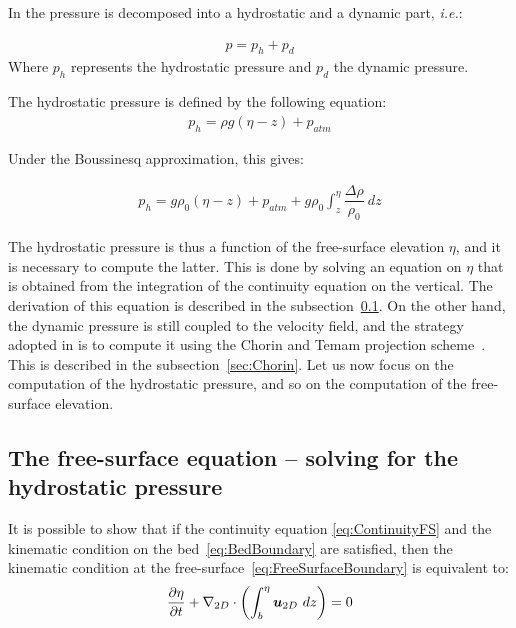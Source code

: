 In  the pressure is decomposed into a hydrostatic and a dynamic part, \textit{i.e.}:

\begin{align}
  p=p_h+p_d
\end{align}
Where $p_h$ represents the hydrostatic pressure and $p_d$ the dynamic pressure.


The hydrostatic pressure is defined by the following equation:
\begin{align}
  p_h = \rho g (\eta-z) + p_{atm}
\end{align}

Under the Boussinesq approximation, this gives:

\begin{align}
  p_h  = g\rho_0(\eta-z) + p_{atm} + g\rho_0\int_z^\eta\dfrac{\Delta\rho}{\rho_0}~dz
\end{align}

The hydrostatic pressure is thus a function of the free-surface elevation $\eta$, and it is necessary to compute the latter.
This is done by solving an equation on $\eta$ that is obtained from the integration of the continuity equation on the vertical.
The derivation of this equation is described in the subsection~\ref{sec:FSequation}.
On the other hand, the dynamic pressure is still coupled to the velocity field, and the strategy adopted in 
is to compute it using the Chorin and Temam projection scheme~\cite{Chorin1968, Temam1968}.
This is described in the subsection~\ref{sec:Chorin}.
Let us now focus on the computation of the hydrostatic pressure, and so on the computation of the free-surface elevation.


\subsection{The free-surface equation -- solving for the hydrostatic pressure}\label{sec:FSequation}

It is possible to show that if the continuity equation \eqref{eq:ContinuityFS} and the kinematic condition on the bed~\eqref{eq:BedBoundary} are satisfied,
then the kinematic condition at the free-surface~\eqref{eq:FreeSurfaceBoundary} is equivalent to:
\begin{align}
  \dfrac{\partial \eta}{\partial t} + \nabla_{2D} \cdot\left(\int_{b}^{\eta}\bm{u}_{2D}~dz\right) = 0
  \label{eq:FS_eq0}
\end{align}

